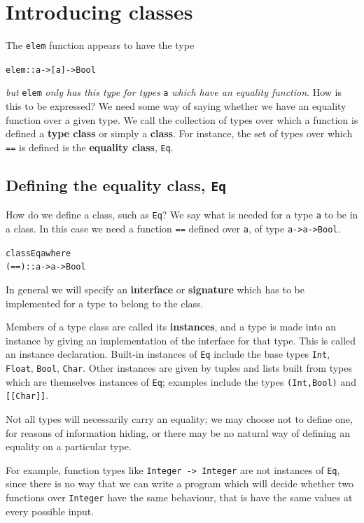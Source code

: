 \section{Introducing classes}

The \texttt{elem} function appears to have the type
\begin{alltt}
elem :: a -> [a] -> Bool
\end{alltt}
\emph{but} \texttt{elem} \emph{only has this type for types} \texttt{a} \emph{which have an equality
function}. How is this to be expressed?
We need some way of saying whether we have an equality
function over a given type. We call the collection of types over which a
function is defined a \textbf{type class} or simply a \textbf{class}. For instance, 
the set of types over which \texttt{==} is
defined is the \textbf{equality class}, \texttt{Eq}.

\subsection*{Defining the equality class, \texttt{Eq}} 

How do we define a class, such as \texttt{Eq}? 
We say what is needed for a type 
\texttt{a} to be in a class. In this case we need a function \texttt{==} defined
over \texttt{a}, of type \texttt{a->a->Bool}. 
\begin{alltt}
class Eq a where
  (==) :: a -> a -> Bool
\end{alltt}
In general we will specify an \textbf{interface} or  \textbf{signature} which has to be implemented for a type to belong to the class.

Members of a type class are called its
\textbf{instances}, and a type is made into an instance by giving an implementation of the interface for that type. This is called an instance declaration.
Built-in instances of \texttt{Eq}
include the base types
\texttt{Int}, \texttt{Float}, \texttt{Bool}, \texttt{Char}. Other instances are given by
tuples and lists
built from types which are themselves instances of \texttt{Eq}; examples include
the types \texttt{(Int,Bool)} and \texttt{[[Char]]}. 

Not all types will necessarily
carry an equality; we may choose not to define one, for reasons of information
hiding, or there may be no natural way of defining an equality on a particular
type. 

For example, function
types like \texttt{Integer -> Integer} are not instances of
\texttt{Eq}, since there is no way that we can write a program which will decide
whether two functions over \texttt{Integer} have the same behaviour, that is have the same values at every possible input.


